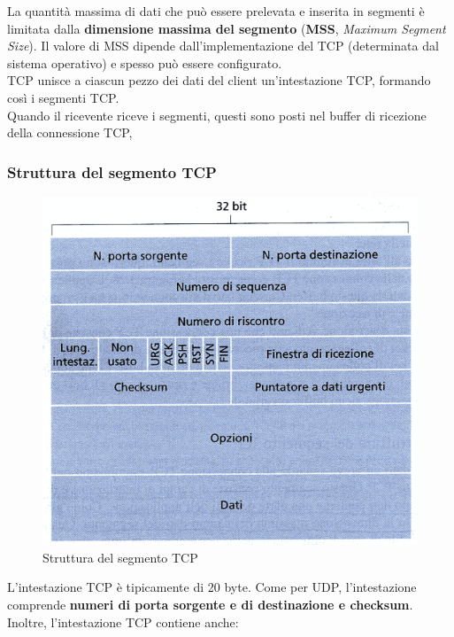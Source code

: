 \documentclass[11pt,a4paper]{article}
\begin{document}
La quantità massima di dati che può essere prelevata e inserita in segmenti è limitata dalla \textbf{dimensione massima del segmento} (\textbf{MSS}, \textit{Maximum Segment Size}). Il valore di MSS dipende dall'implementazione del TCP (determinata dal sistema operativo) e spesso può essere configurato. \\
TCP unisce a ciascun pezzo dei dati del client un'intestazione TCP, formando così i segmenti TCP. \\
Quando il ricevente riceve i segmenti, questi sono posti nel buffer di ricezione della connessione TCP,
\subsubsection{Struttura del segmento TCP}
\begin{figure}
	\includegraphics[scale=0.6]{img/031.png}
	\caption{Struttura del segmento TCP}
\end{figure}
L'intestazione TCP è tipicamente di 20 byte. Come per UDP, l'intestazione comprende \textbf{numeri di porta sorgente e di destinazione e checksum}. Inoltre, l'intestazione TCP contiene anche:
\end{document}
